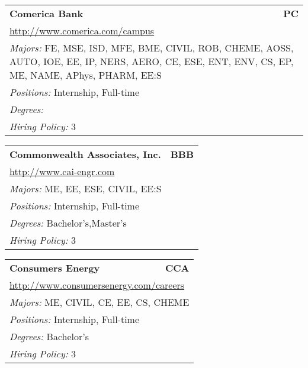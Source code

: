 \documentclass[twoside]{article}
\begin{document}
\begin{center}
\begin{multicols}{3}
\begin{FlushLeft}
\begin{minipage}{\columnwidth}\begin{tabularx}{.95\columnwidth}{Xr}
                 {\Large\bf Comerica Bank} & {\Large\bf PC}\\
    \multicolumn{2}{p{.95\columnwidth}}{\url{http://www.comerica.com/campus}}\\
    \multicolumn{2}{p{.95\columnwidth}}{\emph{Majors:} FE, MSE, ISD, MFE, BME, CIVIL, ROB, CHEME, AOSS, AUTO, IOE, EE, IP, NERS, AERO, CE, ESE, ENT, ENV, CS, EP, ME, NAME, APhys, PHARM, EE:S}\\
    \multicolumn{2}{p{.95\columnwidth}}{\emph{Positions:} Internship, Full-time}\\
    \multicolumn{2}{p{.95\columnwidth}}{\emph{Degrees:} }\\
    \multicolumn{2}{p{.95\columnwidth}}{\emph{Hiring Policy:} 3}\\
    \end{tabularx}
    
\end{minipage}
 
\begin{minipage}{\columnwidth}\begin{tabularx}{.95\columnwidth}{Xr}
                 {\Large\bf Commonwealth Associates, Inc.} & {\Large\bf BBB}\\
    \multicolumn{2}{p{.95\columnwidth}}{\url{http://www.cai-engr.com}}\\
    \multicolumn{2}{p{.95\columnwidth}}{\emph{Majors:} ME, EE, ESE, CIVIL, EE:S}\\
    \multicolumn{2}{p{.95\columnwidth}}{\emph{Positions:} Internship, Full-time}\\
    \multicolumn{2}{p{.95\columnwidth}}{\emph{Degrees:} Bachelor's,Master's}\\
    \multicolumn{2}{p{.95\columnwidth}}{\emph{Hiring Policy:} 3}\\
    \end{tabularx}
    
\end{minipage}
 
\begin{minipage}{\columnwidth}\begin{tabularx}{.95\columnwidth}{Xr}
                 {\Large\bf Consumers Energy} & {\Large\bf CCA}\\
    \multicolumn{2}{p{.95\columnwidth}}{\url{http://www.consumersenergy.com/careers}}\\
    \multicolumn{2}{p{.95\columnwidth}}{\emph{Majors:} ME, CIVIL, CE, EE, CS, CHEME}\\
    \multicolumn{2}{p{.95\columnwidth}}{\emph{Positions:} Internship, Full-time}\\
    \multicolumn{2}{p{.95\columnwidth}}{\emph{Degrees:} Bachelor's}\\
    \multicolumn{2}{p{.95\columnwidth}}{\emph{Hiring Policy:} 3}\\
    \end{tabularx}
    

\end{minipage}
\end{FlushLeft}
\end{multicols}
\end{center}
\end{document}
